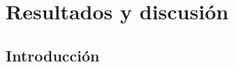 \chapter{Resultados y discusión}\label{ch:resultados}

\section{Introducción}\label{sec:introduccion_resultados}
\lipsum[1-10]
